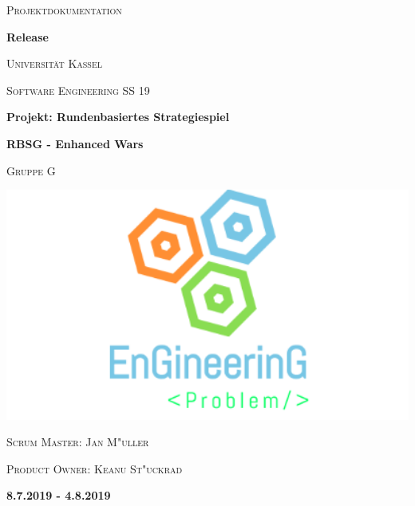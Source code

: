 \documentclass[12pt, titlepage]{scrartcl}
\newcommand{\RN}[1]{%
	\textup{\uppercase\expandafter{\romannumeral#1}}%
}
\begin{document}
    \begin{titlepage}
		\centering
		{\scshape\LARGE Projektdokumentation \par}
		\vspace{0.75cm}
		{\bfseries\Huge Release \RN{3}\par}
		\vspace{0.75cm}
		{\scshape\Large Universit\"at Kassel \par}
		{\scshape\Large Software Engineering \RN{1} SS 19\par}
		\vspace{0.5cm}
		{\bfseries\LARGE Projekt: Rundenbasiertes Strategiespiel \par}
		{\bfseries\LARGE RBSG - Enhanced Wars\par}
		\vspace{0.5cm}
		{\scshape\Large Gruppe G\par}
		\vspace{1.5cm}
		{\includegraphics[width=1\textwidth]{images/Logo.png}\par}
		\vspace{0.5cm}
		{\scshape\Large Scrum Master: Jan M"uller\par}
		{\scshape\Large Product Owner: Keanu St"uckrad\par}
		\vspace{0.75cm}
		{\bfseries\Large 8.7.2019 - 4.8.2019\par}
	\end{titlepage}	
	\setcounter{page}{1}	
\end{document}

